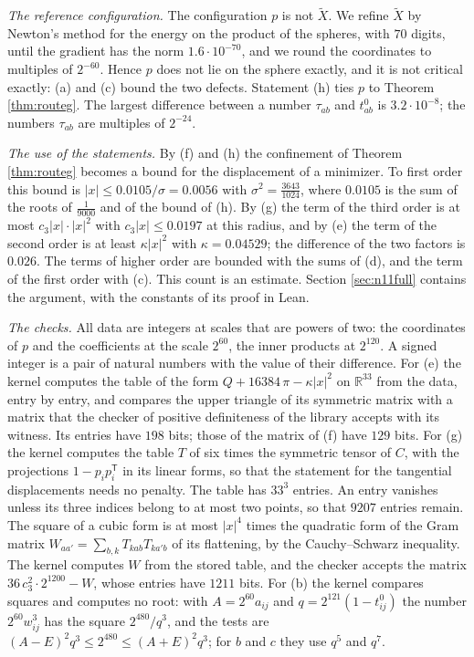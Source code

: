 \documentclass[reqno,a4paper,11pt]{amsart}
\numberwithin{equation}{section}
\def\R{{\mathbb R}}
\newcommand{\factNrlCubAtRadius}{0.0197}
\newcommand{\factNrlCubBits}{1211}
\newcommand{\factNrlHessBits}{198}
\newcommand{\factNrlKappaDec}{0.04529}
\newcommand{\factNrlLinkDiff}{3.2 \cdot 10^{-8}}
\newcommand{\factNrlNet}{0.026}
\newcommand{\factNrlRadius}{0.0056}
\newcommand{\factNrlRefGrad}{1.6 \cdot 10^{-70}}
\newcommand{\factNrlRho}{0.0105}
\newcommand{\factNrlRigBits}{129}
\newcommand{\factNrlTabNonzero}{9207}
\begin{document}
\emph{The reference configuration.} The configuration $p$ is not $\tilde X$. We refine $\tilde X$ by Newton's method for the energy on the product of the spheres, with $70$ digits, until the gradient has the norm $\factNrlRefGrad$, and we round the coordinates to multiples of $2^{-60}$. Hence $p$ does not lie on the sphere exactly, and it is not critical exactly: (a) and (c) bound the two defects. Statement (h) ties $p$ to Theorem \ref{thm:routeg}. The largest difference between a number $\tau_{ab}$ and $t^0_{ab}$ is $\factNrlLinkDiff$; the numbers $\tau_{ab}$ are multiples of $2^{-24}$.

\emph{The use of the statements.} By (f) and (h) the confinement of Theorem \ref{thm:routeg} becomes a bound for the displacement of a minimizer. To first order this bound is $|x| \leq \factNrlRho / \sigma = \factNrlRadius$ with $\sigma^2 = \tfrac{3643}{1024}$, where $\factNrlRho$ is the sum of the roots of $\tfrac{1}{9000}$ and of the bound of (h). By (g) the term of the third order is at most $c_3 |x| \cdot |x|^2$ with $c_3 |x| \leq \factNrlCubAtRadius$ at this radius, and by (e) the term of the second order is at least $\kappa |x|^2$ with $\kappa = \factNrlKappaDec$; the difference of the two factors is $\factNrlNet$. The terms of higher order are bounded with the sums of (d), and the term of the first order with (c). This count is an estimate. Section \ref{sec:n11full} contains the argument, with the constants of its proof in Lean.

\emph{The checks.} All data are integers at scales that are powers of two: the coordinates of $p$ and the coefficients at the scale $2^{60}$, the inner products at $2^{120}$. A signed integer is a pair of natural numbers with the value of their difference. For (e) the kernel computes the table of the form $Q + 16384 \, \pi - \kappa |x|^2$ on $\R^{33}$ from the data, entry by entry, and compares the upper triangle of its symmetric matrix with a matrix that the checker of positive definiteness of the library accepts with its witness. Its entries have $\factNrlHessBits$ bits; those of the matrix of (f) have $\factNrlRigBits$ bits. For (g) the kernel computes the table $T$ of six times the symmetric tensor of $C$, with the projections $1 - p_i p_i^{\mathsf T}$ in its linear forms, so that the statement for the tangential displacements needs no penalty. The table has $33^3$ entries. An entry vanishes unless its three indices belong to at most two points, so that $\factNrlTabNonzero$ entries remain. The square of a cubic form is at most $|x|^4$ times the quadratic form of the Gram matrix $W_{aa'} = \sum_{b,k} T_{kab} T_{ka'b}$ of its flattening, by the Cauchy--Schwarz inequality. The kernel computes $W$ from the stored table, and the checker accepts the matrix $36 \, c_3^2 \cdot 2^{1200} - W$, whose entries have $\factNrlCubBits$ bits. For (b) the kernel compares squares and computes no root: with $A = 2^{60} a_{ij}$ and $q = 2^{121} (1 - t^0_{ij})$ the number $2^{60} w_{ij}^3$ has the square $2^{480} / q^3$, and the tests are $(A - E)^2 q^3 \leq 2^{480} \leq (A + E)^2 q^3$; for $b$ and $c$ they use $q^5$ and $q^7$.
\end{document}
